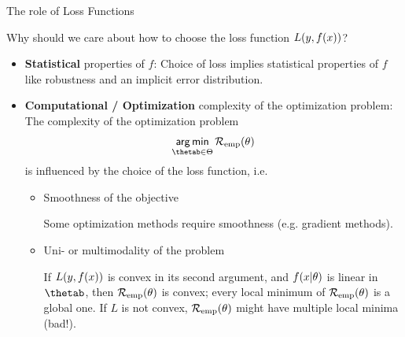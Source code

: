 \begin{vbframe}{The role of Loss Functions}

Why should we care about how to choose the loss function $L(y, f(x))$?

\begin{itemize}
\item \textbf{Statistical} properties of $f$: Choice of loss implies statistical properties of $f$ like robustness and an implicit error distribution.
\item \textbf{Computational / Optimization} complexity of the optimization problem: The complexity of the optimization problem
$$
\argmin_{\thetab \in \Theta} \risket
$$
is influenced by the choice of the loss function, i.e.\

  \begin{itemize}
    \item Smoothness of the objective \\
    \begin{footnotesize} 
    Some optimization methods require smoothness (e.g. gradient methods).
    \end{footnotesize}
    \item Uni- or multimodality of the problem \\
    \begin{footnotesize} 
    If $L(y, f(x))$ is convex in its second argument, and $f(x | \theta)$ is linear in $\thetab$, then $\mathcal{R}_{\text{emp}}(\theta)$ is convex; every local minimum of $\mathcal{R}_{\text{emp}}(\theta)$ is a global one. If $L$ is not convex, $\mathcal{R}_{\text{emp}}(\theta)$ might have multiple local minima (bad!).
    \end{footnotesize}
  \end{itemize}
\end{itemize}


\end{vbframe}





